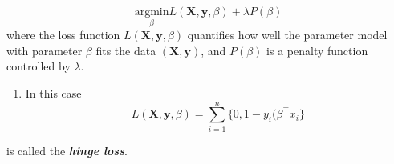 \documentclass[11pt]{article}
\providecommand{\tightlist}{%
      \setlength{\itemsep}{0pt}\setlength{\parskip}{0pt}}
\begin{document}
\[\underset{\beta}{\text{argmin}}L(\mathbf{X}, \mathbf{y}, \beta) + \lambda P(\beta)\]
where the loss function \(L(\mathbf{X}, \mathbf{y}, \beta)\) quantifies
how well the parameter model with parameter \(\beta\) fits the data
\((\mathbf{X}, \mathbf{y})\), and \(P(\beta)\) is a penalty function
controlled by \(\lambda\).

\hypertarget{foot84}{}
\begin{enumerate}
\def\labelenumi{\arabic{enumi}.}
\setcounter{enumi}{83}
\tightlist
\item
  In this case
  \[L(\mathbf{X}, \mathbf{y}, \beta) = \sum_{i = 1}^n \{0, 1 - y_i(\beta^\top x_i\}\]
\end{enumerate}

is called the \textbf{\emph{hinge loss}}.


    
    
    
    
\end{document}
